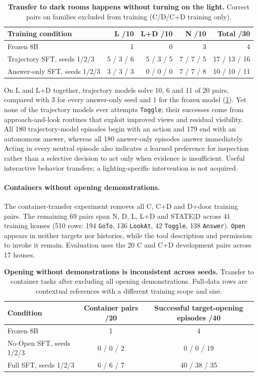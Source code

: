 \documentclass{article}
\begin{document}
\begin{table}[t]
\centering
\caption{\textbf{Transfer to dark rooms happens without turning on the light.} Correct pairs on families excluded from training (C/D/C+D training only).}
\label{tab:light}
\begin{tabular}{lrrrr}
\toprule
Training condition & L /10 & L+D /10 & N /10 & Total /30 \\
\midrule
Frozen 8B & 1 & 0 & 3 & 4 \\
Trajectory SFT, seeds 1/2/3 & 5 / 3 / 6 & 5 / 3 / 5 & 7 / 7 / 5 & 17 / 13 / 16 \\
Answer-only SFT, seeds 1/2/3 & 3 / 3 / 3 & 0 / 0 / 0 & 7 / 7 / 8 & 10 / 10 / 11 \\
\bottomrule
\end{tabular}
\end{table}

On L and L+D together, trajectory models solve 10, 6 and 11 of 20 pairs, compared with 3 for every answer-only seed and 1 for the frozen model (\cref{tab:light}). Yet none of the trajectory models ever attempts \texttt{Toggle}; their successes come from approach-and-look routines that exploit improved views and residual visibility. All 180 trajectory-model episodes begin with an action and 179 end with an autonomous answer, whereas all 180 answer-only episodes answer immediately. Acting in every neutral episode also indicates a learned preference for inspection rather than a selective decision to act only when evidence is insufficient. Useful interactive behavior transfers; a lighting-specific intervention is not acquired.

\paragraph{Containers without opening demonstrations.} The container-transfer experiment removes all C, C+D and D+door training pairs. The remaining 69 pairs span N, D, L, L+D and STATE$|$D across 41 training houses (510 rows: 194 \texttt{GoTo}, 136 \texttt{LookAt}, 42 \texttt{Toggle}, 138 \texttt{Answer}). \texttt{Open} appears in neither targets nor histories, while the tool description and permission to invoke it remain. Evaluation uses the 20 C and C+D development pairs across 17 houses.

\begin{table}[t]
\centering
\caption{\textbf{Opening without demonstrations is inconsistent across seeds.} Transfer to container tasks after excluding all opening demonstrations. Full-data rows are contextual references with a different training scope and size.}
\label{tab:noopen}
\begin{tabular}{lcc}
\toprule
Condition & Container pairs /20 & Successful target-opening episodes /40 \\
\midrule
Frozen 8B & 1 & 4 \\
No-Open SFT, seeds 1/2/3 & 0 / 0 / 2 & 0 / 0 / 19 \\
Full SFT, seeds 1/2/3 & 6 / 6 / 7 & 40 / 38 / 35 \\
\bottomrule
\end{tabular}
\end{table}
\end{document}
